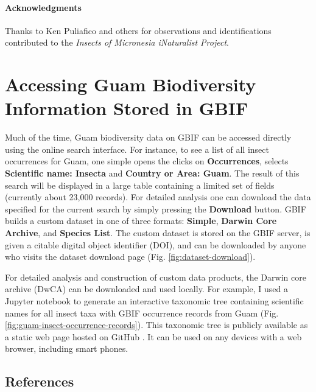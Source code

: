 \documentclass[12pt,letterpaper,english,bibliography=totocnumbered, abstract=on]{scrartcl}
\begin{document}
\paragraph{Acknowledgments} Thanks to Ken Puliafico and others for observations and identifications contributed to the \textit{Insects of Micronesia iNaturalist Project}.





\pagebreak
\section{Accessing Guam Biodiversity Information Stored in GBIF}
\newrefsection[my.bib]

Much of the time, Guam biodiversity data on GBIF can be accessed directly using the online search interface. For instance, to see a list of all insect occurrences for Guam, one simple opens the clicks on \textbf{Occurrences}, selects \textbf{Scientific name: Insecta} and \textbf{Country or Area: Guam}. The result of this search will be displayed in a large table containing a limited set of fields (currently about 23,000 records). For detailed analysis one can download the data specified for the current search by simply pressing the \textbf{Download} button. GBIF builds a custom dataset in one of three formats: \textbf{Simple}, \textbf{Darwin Core Archive}, and \textbf{Species List}. The custom dataset is stored on the GBIF server, is given a citable digital object identifier (DOI), and can be downloaded by anyone who visits the dataset download page \cite{https://doi.org/10.15468/dl.yztrkr} (Fig. \ref{fig:dataset-download}).

For detailed analysis and construction of custom data products, the Darwin core archive (DwCA) can be downloaded and used locally. For example, I used a Jupyter notebook \cite{taxonview-ipynb} to generate an interactive taxonomic tree containing scientific names for all insect taxa with GBIF occurrence records from Guam (Fig. \ref{fig:guam-insect-occurrence-records}). This taxonomic tree is publicly available as a static web page hosted on GitHub \cite{taxonview-page}. It can be used on any devices with a web browser, including smart phones.


\subsection{References}
\printbibliography[heading=none]
\end{document}
